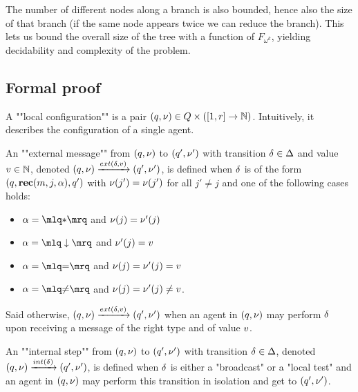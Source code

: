  The number of different nodes along a branch is also bounded, hence also the size of that branch (if the same node appears twice we can reduce the branch).
 This lets us bound the overall size of the tree with a function of $F_{\omega^k}$, yielding decidability and complexity of the problem.

\subsection{Formal proof}
\fi


\begin{definition}			
	A ""local configuration"" is a pair $(q, \nu) \in Q \times ([1,r] \to \mathbb{N})$. Intuitively, it describes the configuration of a single agent. 

	An ""external message"" from $(q,\nu)$ to $(q',\nu')$ with transition $\delta \in \Delta$ and value $v \in \mathbb{N}$, denoted $(q,\localdata) \extbr{\atrans}{\aval} (q',\localdata')$, is defined when $\delta$ is of the form $(q,\textbf{rec}(m, j, \alpha),q')$ with $\nu(j') = \nu(j')$ for all $j' \neq j$ and one of the following cases holds:
	
	\begin{minipage}[t]{6cm}
		\begin{itemize}
			\item $\anact = \quotemarks{\dummyact}$ 
			and $\nu(j) = \nu'(j)$
			\item $\anact = \quotemarks{\enregact}$ and $\nu'(j) = v$
		\end{itemize}
	\end{minipage}
	\begin{minipage}[t]{6cm}
		\begin{itemize}
			\item $\anact = \quotemarks{\eqtestact}$ and $\nu(j) = \nu'(j)= v$
			\item $\anact = \quotemarks{\diseqtestact}$ and $\nu(j) = \nu'(j) \ne v$.
		\end{itemize}
	\end{minipage}
	
	Said otherwise, $(q,\localdata) \extbr{\atrans}{\aval} (q',\localdata')$ when an agent in $(q,\nu)$ may perform $\delta$ upon receiving a message of the right type and of value $v$.

	An ""internal step"" from $(q,\nu)$ to $(q',\nu')$ with transition $\delta \in \Delta$, denoted $(q,\localdata) \intstep{\atrans} (q',\localdata')$, is defined when $\delta$ is either a "broadcast" or a "local test" and an agent in $(q,\nu)$ may perform this transition in isolation and get to $(q',\nu')$. 


\end{definition}
